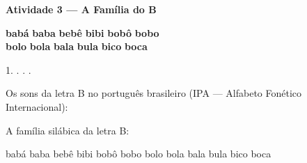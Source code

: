 \begin{consolidacao}
\textbf{Atividade 3 --- A Fam\'ilia do B}


\begin{center}
\textbf{bab\'a} \quad \textbf{baba} \quad \textbf{beb\^e} \quad \textbf{bibi} \quad \textbf{bob\^o} \quad \textbf{bobo}\\[0.5em]
\textbf{bolo} \quad \textbf{bola} \quad \textbf{bala} \quad \textbf{bula} \quad \textbf{bico} \quad \textbf{boca}
\end{center}
\begin{center}
1. \underline{\hspace{3cm}} . \underline{\hspace{3cm}} . \underline{\hspace{3cm}} . \underline{\hspace{3cm}}
\end{center}

\end{consolidacao}


\begin{sonsdaletra}
Os sons da letra B no portugu\^es{} brasileiro (IPA --- Alfabeto Fon\'etico Internacional):

\end{sonsdaletra}


\begin{familiasilabica}
A fam\'ilia sil\'abica da letra B:

\begin{center}
bab\'a \quad baba \quad beb\^e \quad bibi \quad bob\^o \quad bobo \quad bolo \quad bola \quad bala \quad bula \quad bico \quad boca
\end{center}
\end{familiasilabica}


